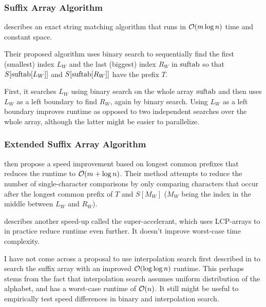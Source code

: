 \documentclass[a4paper,10pt]{article}
\begin{document}
\subsubsection*{Suffix Array Algorithm}

\citealt{manber1993suffix} describes an exact string matching algorithm
that runs in ${\cal{O}}(m \log n)$ time and constant space.

Their proposed algorithm uses binary search to sequentially find
the first (smallest) index $L_{W}$ and the last (biggest) index
$R_{W}$ in $\hbox{suftab}$ so that $S[\hbox{suftab}[L_{W}]]$ and
$S[\hbox{suftab}[R_{W}]]$ have the prefix $T$.

First, it searches $L_{W}$ using binary search on the whole array
$\hbox{suftab}$ and then uses $L_{W}$ as a left boundary to find $R_{W}$,
again by binary search.  Using $L_{W}$ as a left boundary improves
runtime as opposed to two independent searches over the whole array,
although the latter might be easier to parallelize.

\subsubsection*{Extended Suffix Array Algorithm}

\citealt{manber1993suffix} then propose a speed improvement based on
longest common prefixes that reduces the runtime to ${\cal{O}}(m + \log
n)$. Their method attempts to reduce the number of single-character
comparisons by only comparing characters that occur after the longest
common prefix of $T$ and $S[M_{W}]$ ($M_{W}$ being the index in the
middle between $L_{W}$ and $R_{W}$).

\citealt[p. 152]{gusfield1997algorithms} describes another speed-up
called the super-accelerant, which uses LCP-arrays to in practice reduce
runtime even further. It doesn't improve worst-case time complexity.


I have not come across a proposal to use interpolation search first
described in \citealt{perl1978interpolation} to search the suffix array
with an improved ${\cal{O}}(\log \log n)$ runtime. This perhaps stems
from the fact that interpolation search assumes uniform distribution of
the alphabet, and has a worst-case runtime of ${\cal{O}}(n)$. It still
might be useful to empirically test speed differences in binary and
interpolation search.
\end{document}
